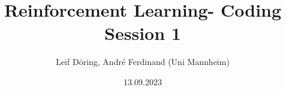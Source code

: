 \documentclass[10pt, aspectratio=169, hyperref={colorlinks = true,linkcolor = blue}]{beamer}
\title{Reinforcement Learning- Coding Session 1}
\subtitle{Leif D\"oring, Andr\'e Ferdinand (Uni Mannheim)}
\date{13.09.2023}
\begin{document}
	\maketitle
	\tableofcontents
	\makeatother
	
	
	
	
\end{document}
